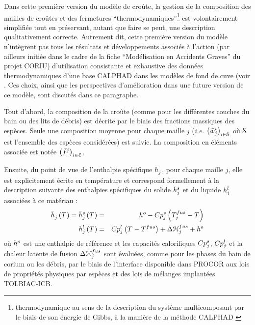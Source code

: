 
Dans cette première version du modèle de croûte, la gestion de la composition des mailles de croûtes et des fermetures ``thermodynamiques''\footnote{thermodynamique au sens de la description du système multicomposant par le biais de son énergie de Gibbs, à la manière de la méthode CALPHAD \cite{Lukas2007}} est volontairement simplifiée tout en préservant, autant que faire se peut, une description qualitativement correcte. Autrement dit, cette première version du modèle n'intègrent pas tous les résultats et développements associés à l'action (par ailleurs initiée dans le cadre de la fiche ``Modélisation en Accidents Graves'' du projet CORIU) d'utilisation consistante et exhaustive des données thermodynamiques d'une base CALPHAD dans les modèles de fond de cuve (voir \cite{LeTellier2016b,Tiwari2018,LeTellier2019}. Ces choix, ainsi que les perspectives d'amélioration dans une future version de ce modèle, sont discutés dans ce paragraphe.

Tout d'abord, la composition de la croûte (comme pour les différentes couches du bain ou des lits de débris) est décrite par le biais des fractions massiques des espèces. Seule une composition moyenne pour chaque maille $j$  (\textit{i.e.} $\left(\avMassFraction[i]{j}\right)_{i\in \speciesSet}$ où $\speciesSet$ est l'ensemble des espèces considérées) est suivie. La composition en éléments associée est notée $\left(\elementMassFraction[j]{}\right)_{i\in\elementSet}$.

Ensuite, du point de vue de l'enthalpie spécifique $\avMassEnthalpy{j}$, pour chaque maille $j$, elle est explicitement écrite en température et correspond formellement à la description suivante des enthalpies spécifiques du solide $\avMassEnthalpy[s]{j}$ et du liquide $\massEnthalpy[l]{j}$ associées à ce matériau :
\begin{eqnarray}
 \avMassEnthalpy{j} \left(\temperature{}\right) = \avMassEnthalpy[s]{j} \left(\temperature{}\right) &=& \massEnthalpy[o]{} - \heatCp[s]{j} \left(\temperature[fus]{j} - \temperature{}\right) \\
 \massEnthalpy[l]{j} \left(\temperature{}\right) &=& \heatCp[l]{j} \left(\temperature{} - \temperature[fus]{}\right) + \dEnthalpy[fus]{j} + \massEnthalpy[o]{}
\end{eqnarray}
où $\massEnthalpy[o]{}$ est une enthalpie de référence et les capacités calorifiques $\heatCp[s]{j}$, $\heatCp[l]{j}$ et la chaleur latente de fusion $\dEnthalpy[fus]{j}$ sont évaluées, comme pour les phases du bain de corium ou les débris, par le biais de l'interface disponible dans PROCOR aux lois de propriétés physiques par espèces et des lois de mélanges implantées TOLBIAC-ICB.

